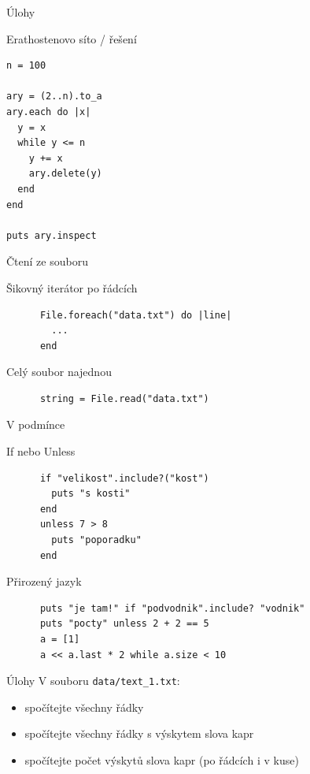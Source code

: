 \documentclass{beamer}
\begin{document}
\begin{frame}[fragile]{Úlohy}
  \begin{block}{Erathostenovo síto / řešení}
\begin{verbatim}
n = 100

ary = (2..n).to_a
ary.each do |x|
  y = x
  while y <= n
    y += x
    ary.delete(y)
  end
end

puts ary.inspect
\end{verbatim}
  \end{block}
\end{frame}

\begin{frame}[fragile]{Čtení ze souboru}
  \begin{block}{Šikovný iterátor po řádcích}
    \begin{verbatim}
      File.foreach("data.txt") do |line|
        ...
      end
    \end{verbatim}
  \end{block}
  \pause
  \begin{block}{Celý soubor najednou}
    \begin{verbatim}
      string = File.read("data.txt")
    \end{verbatim}
  \end{block}
\end{frame}

\begin{frame}[fragile]{V podmínce}
  \begin{block}{If nebo Unless}
    \scriptsize
    \begin{verbatim}
      if "velikost".include?("kost")
        puts "s kosti"
      end
      unless 7 > 8
        puts "poporadku"
      end
    \end{verbatim}
  \end{block}
  \pause
  \begin{block}{Přirozený jazyk}
    \scriptsize
    \begin{verbatim}
      puts "je tam!" if "podvodnik".include? "vodnik"
      puts "pocty" unless 2 + 2 == 5
      a = [1]
      a << a.last * 2 while a.size < 10
    \end{verbatim}
  \end{block}
\end{frame}

\begin{frame}{Úlohy}
  V souboru \texttt{data/text\_1.txt}:
  \begin{itemize}
    \item spočítejte všechny řádky
    \item spočítejte všechny řádky s výskytem slova kapr
    \item spočítejte počet výskytů slova kapr (po řádcích i v kuse)
  \end{itemize}
\end{frame}
\end{document}
